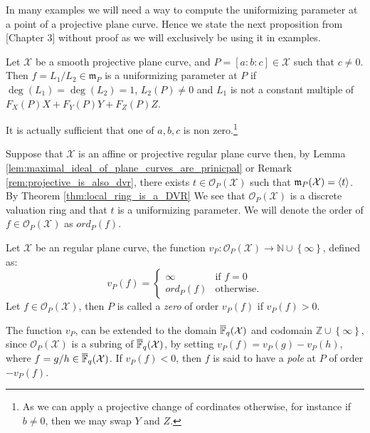 In many examples we will need a way to compute the uniformizing parameter at a point of a projective plane curve. Hence we state the next proposition from \cite{notes_on_alg_geom_codes}[Chapter 3] without proof as we will exclusively be using it in examples.
\begin{proposition}\label{prop:uniformizing_parameter}
  Let $\mathcal{X}$ be a smooth projective plane curve, and $P = [a : b : c] \in \mathcal{X}$ such that $c \neq 0$. Then $f = L_{1} / L_{2} \in \mathfrak{m}_{P}$ is a uniformizing parameter at $P$ if $\deg(L_{1}) = \deg(L_{2}) = 1$, $L_{2}(P) \neq 0$ and $L_1$ is not a constant multiple of $F_X(P)X + F_Y(P)Y + F_Z(P)Z$.
\end{proposition}
\begin{remark}
  It is actually sufficient that one of $a, b, c$ is non zero.\footnote{As we can apply a projective change of cordinates otherwise, for instance if $b \neq 0$, then we may swap $Y$ and $Z$.}
\end{remark}

Suppose that $\mathcal{X}$ is an affine or projective regular plane curve then, by Lemma \ref{lem:maximal_ideal_of_plane_curves_are_prinicpal} or Remark \ref{rem:projective_is_also_dvr}, there exists $t \in \mathcal{O}_{P}(\mathcal{X})$ such that $\mathfrak{m}_{P}(\mathcal{X}) = \langle t\rangle$. By Theorem \ref{thm:local_ring_is_a_DVR} We see that $\mathcal{O}_{P}(\mathcal{X})$ is a discrete valuation ring and that $t$ is a uniformizing parameter. We will denote the order of $f \in \mathcal{O}_{P}(\mathcal{X})$ as $ord_{P}(f)$.

\begin{definition}\label{def:vp}
  Let $\mathcal{X}$ be an regular plane curve, the function $v_{P}: \mathcal{O}_{P}(\mathcal{X}) \to \mathbb{N} \cup \left\{\infty\right\}$, defined as:
  \begin{equation*}
    v_{P}(f) = \begin{cases} \infty & \text{if } f = 0 \\ ord_{P}(f) & \text{otherwise.} \end{cases}
  \end{equation*}
  Let $f \in \mathcal{O}_{P}(\mathcal{X})$, then $P$ is called a \textit{zero} of order $v_P(f)$ if $v_{P}(f) > 0$.
\end{definition}
\begin{remark}\label{rem:extension}
The function $v_{P}$, can be extended to the domain $\overline{\mathbb{F}}_{q}(\mathcal{X})$ and codomain $\mathbb{Z} \cup \left\{\infty\right\}$, since $\mathcal{O}_{P}(\mathcal{X})$ is a subring of $\overline{\mathbb{F}}_{q}(\mathcal{X})$, by setting $v_{P}(f) = v_{P}(g) - v_{P}(h)$, where $f = g/h \in \overline{\mathbb{F}}_{q}(\mathcal{X})$. If $v_{P}(f) < 0$, then $f$ is said to have a \textit{pole} at $P$ of order $-v_{P}(f)$.
\end{remark}


